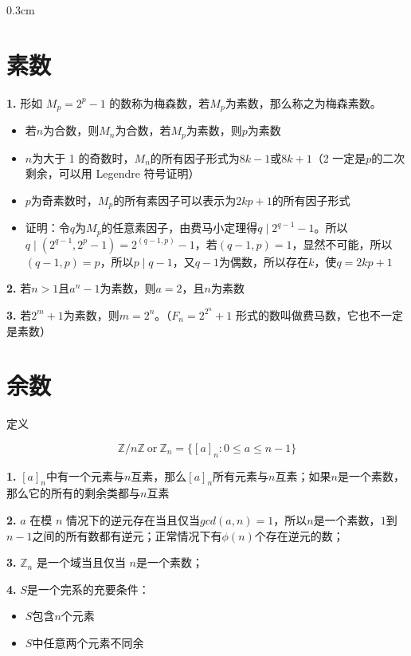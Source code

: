 \documentclass{article}
\newcommand{\setParDis}{\setlength {\parskip} {0.3cm} }
\newcommand{\nident}{\setlength{\parindent}{0pt}}
\begin{document}
\setParDis

\section{素数}

\textbf{1.} 形如 $M_p=2^p-1$ 的数称为梅森数，若$M_p$为素数，那么称之为梅森素数。

\begin{itemize}
    \item 若$n$为合数，则$M_n$为合数，若$M_p$为素数，则$p$为素数
    \item $n$为大于 1 的奇数时，$M_n$的所有因子形式为$8k-1$或$8k+1$（2 一定是$p$的二次剩余，可以用 Legendre 符号证明）
    \item $p$为奇素数时，$M_p$的所有素因子可以表示为$2kp+1$的所有因子形式
    \item[] 证明：令$q$为$M_p$的任意素因子，由费马小定理得$q\mid 2^{q-1}-1$。所以$q\mid (2^{q-1},2^p-1)=2^{(q-1,p)}-1$，若$(q-1,p)=1$，显然不可能，所以$(q-1,p)=p$，所以$p\mid q-1$，又$q-1$为偶数，所以存在$k$，使$q=2kp+1$
\end{itemize}

\textbf{2.} 若$n>1$且$a^n-1$为素数，则$a=2$，且$n$为素数

\textbf{3.} 若$2^m+1$为素数，则$m=2^n$。（$F_n=2^{2^n}+1$ 形式的数叫做费马数，它也不一定是素数）


\section{余数}

定义

$$\mathbb{Z}/n\mathbb{Z}\ \text{or} \ \mathbb{Z}_n=\{[a]_n: 0\le a\le n-1\}$$

\textbf{1.} $[a]_n$中有一个元素与$n$互素，那么$[a]_n$所有元素与$n$互素；如果$n$是一个素数，那么它的所有的剩余类都与$n$互素

\textbf{2.} $a$ 在模 $n$ 情况下的逆元存在当且仅当$gcd(a, n)=1$，所以$n$是一个素数，$1$到$n-1$之间的所有数都有逆元；正常情况下有$\phi(n)$个存在逆元的数；

\textbf{3.} $\mathbb{Z}_n$ 是一个域当且仅当 $n$是一个素数；

\textbf{4.} $S$是一个完系的充要条件：

\begin{itemize}
    \item $S$包含$n$个元素
    \item $S$中任意两个元素不同余
\end{itemize}
\end{document}
